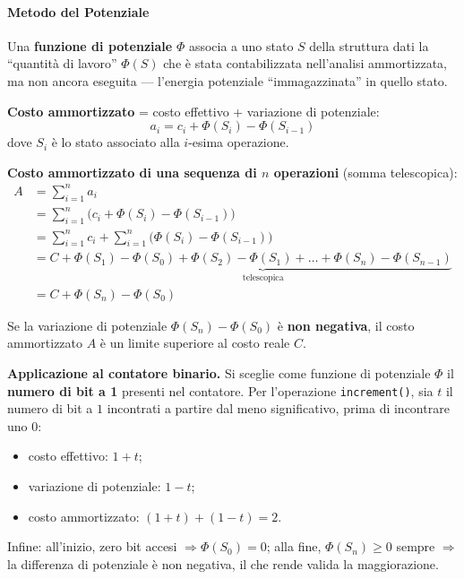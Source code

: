 \documentclass[12pt, a4paper]{article}
\begin{document}
\paragraph{Metodo del Potenziale}

\begin{tcolorbox}[colback=lightergray!10, colframe=tocsec, title=\textbf{Definizione: Funzione di Potenziale}]
\label{def:funzione-potenziale}
Una \textbf{funzione di potenziale} $\Phi$ associa a uno stato $S$ della struttura dati la ``quantità di lavoro'' $\Phi(S)$ che è stata contabilizzata nell'analisi ammortizzata, ma non ancora eseguita — l'energia potenziale ``immagazzinata'' in quello stato.

\textbf{Costo ammortizzato} = costo effettivo + variazione di potenziale:
$$a_i = c_i + \Phi(S_i) - \Phi(S_{i-1})$$
dove $S_i$ è lo stato associato alla $i$-esima operazione.
\end{tcolorbox}

\textbf{Costo ammortizzato di una sequenza di $n$ operazioni} (somma telescopica):
\begin{align*}
A &= \sum_{i=1}^n a_i \\
  &= \sum_{i=1}^n \big(c_i + \Phi(S_i) - \Phi(S_{i-1})\big) \\
  &= \sum_{i=1}^n c_i + \sum_{i=1}^n \big(\Phi(S_i) - \Phi(S_{i-1})\big) \\
  &= C + \underbrace{\Phi(S_1)-\Phi(S_0) + \Phi(S_2)-\Phi(S_1) + \ldots + \Phi(S_n)-\Phi(S_{n-1})}_{\text{telescopica}} \\
  &= C + \Phi(S_n) - \Phi(S_0)
\end{align*}

\begin{tcolorbox}[colback=lightergray!5, colframe=tocsubsec, title=\textbf{Osservazione Chiave}]
Se la variazione di potenziale $\Phi(S_n) - \Phi(S_0)$ è \textbf{non negativa}, il costo ammortizzato $A$ è un limite superiore al costo reale $C$.
\end{tcolorbox}

\textbf{Applicazione al contatore binario.} Si sceglie come funzione di potenziale $\Phi$ il \textbf{numero di bit a 1} presenti nel contatore. Per l'operazione \texttt{increment()}, sia $t$ il numero di bit a $1$ incontrati a partire dal meno significativo, prima di incontrare uno $0$:
\begin{itemize}
    \item costo effettivo: $1+t$;
    \item variazione di potenziale: $1-t$;
    \item costo ammortizzato: $(1+t)+(1-t) = 2$.
\end{itemize}
Infine: all'inizio, zero bit accesi $\Rightarrow \Phi(S_0)=0$; alla fine, $\Phi(S_n) \ge 0$ sempre $\Rightarrow$ la differenza di potenziale è non negativa, il che rende valida la maggiorazione.
\end{document}
